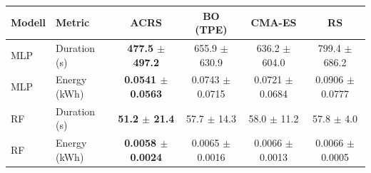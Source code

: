 \begin{tabular}{llcccc}
\toprule
Modell & Metric & ACRS & BO (TPE) & CMA-ES & RS \\
\midrule
MLP & Duration (s) & \textbf{477.5 $\pm$ 497.2} & 655.9 $\pm$ 630.9 & 636.2 $\pm$ 604.0 & 799.4 $\pm$ 686.2 \\
MLP & Energy (kWh) & \textbf{0.0541 $\pm$ 0.0563} & 0.0743 $\pm$ 0.0715 & 0.0721 $\pm$ 0.0684 & 0.0906 $\pm$ 0.0777 \\
\midrule
RF & Duration (s) & \textbf{51.2 $\pm$ 21.4} & 57.7 $\pm$ 14.3 & 58.0 $\pm$ 11.2 & 57.8 $\pm$ 4.0 \\
RF & Energy (kWh) & \textbf{0.0058 $\pm$ 0.0024} & 0.0065 $\pm$ 0.0016 & 0.0066 $\pm$ 0.0013 & 0.0066 $\pm$ 0.0005 \\
\bottomrule
\end{tabular}
